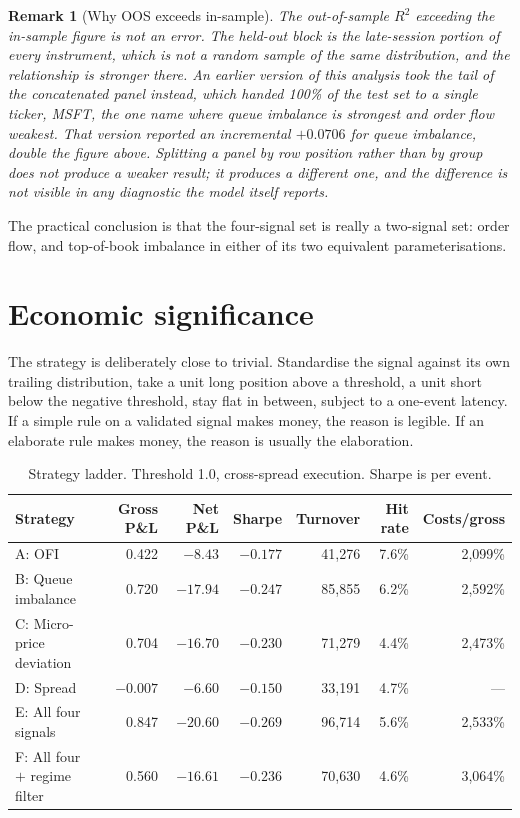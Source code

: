 \documentclass[11pt]{scrartcl}
\newtheorem{remark}{Remark}[section]
\begin{document}
\begin{remark}[Why OOS exceeds in-sample]
The out-of-sample $R^2$ exceeding the in-sample figure is not an error. The held-out block is the late-session portion of every instrument, which is not a random sample of the same distribution, and the relationship is stronger there. An earlier version of this analysis took the tail of the concatenated panel instead, which handed 100\% of the test set to a single ticker, MSFT, the one name where queue imbalance is strongest and order flow weakest. That version reported an incremental $+0.0706$ for queue imbalance, double the figure above. Splitting a panel by row position rather than by group does not produce a weaker result; it produces a different one, and the difference is not visible in any diagnostic the model itself reports.
\end{remark}

The practical conclusion is that the four-signal set is really a two-signal set: order flow, and top-of-book imbalance in either of its two equivalent parameterisations.

\section{Economic significance}
\label{sec:economics}

The strategy is deliberately close to trivial. Standardise the signal against its own trailing distribution, take a unit long position above a threshold, a unit short below the negative threshold, stay flat in between, subject to a one-event latency. If a simple rule on a validated signal makes money, the reason is legible. If an elaborate rule makes money, the reason is usually the elaboration.

\begin{table}[H]
\centering
\caption{Strategy ladder. Threshold 1.0, cross-spread execution. Sharpe is per event.}
\label{tab:ladder}
\begin{tabular}{lrrrrrr}
\toprule
Strategy & Gross P\&L & Net P\&L & Sharpe & Turnover & Hit rate & Costs/gross \\
\midrule
A: OFI                   & 0.422 & $-8.43$  & $-0.177$ & 41{,}276 & 7.6\% & 2{,}099\% \\
B: Queue imbalance       & 0.720 & $-17.94$ & $-0.247$ & 85{,}855 & 6.2\% & 2{,}592\% \\
C: Micro-price deviation & 0.704 & $-16.70$ & $-0.230$ & 71{,}279 & 4.4\% & 2{,}473\% \\
D: Spread                & $-0.007$ & $-6.60$ & $-0.150$ & 33{,}191 & 4.7\% & --- \\
E: All four signals      & 0.847 & $-20.60$ & $-0.269$ & 96{,}714 & 5.6\% & 2{,}533\% \\
F: All four $+$ regime filter & 0.560 & $-16.61$ & $-0.236$ & 70{,}630 & 4.6\% & 3{,}064\% \\
\bottomrule
\end{tabular}
\end{table}
\end{document}
